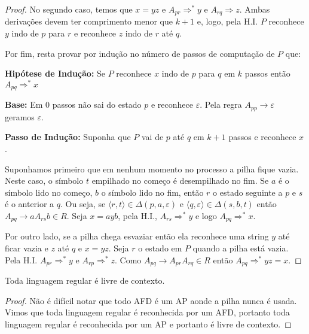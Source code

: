 \begin{proof}
No segundo caso, temos que $x = yz$ e $A_{pr} \Rightarrow^* y$ e $A_{rq} \Rightarrow z$.
Ambas derivações devem ter comprimento menor que $k + 1$ e, logo, pela H.I. $P$ reconhece $y$ indo de $p$ para $r$ e reconhece $z$ indo de $r$ até $q$.

Por fim, resta provar por indução no número de passos de computação de $P$ que:

{\bf Hipótese de Indução:} Se $P$ reconhece $x$ indo de $p$ para $q$ em $k$ passos então $A_{pq} \Rightarrow^* x$

{\bf Base:} Em $0$ passos não sai do estado $p$ e reconhece $\varepsilon$.
Pela regra $A_{pp} \to \varepsilon$ geramos $\varepsilon$.

{\bf Passo de Indução:} Suponha que $P$ vai de $p$ até $q$ em $k+1$ passos e reconhece $x$.

Suponhamos primeiro que em nenhum momento no processo a pilha fique vazia.
Neste caso, o símbolo $t$ empilhado no começo é desempilhado no fim.
Se $a$ é o símbolo lido no começo, $b$ o símbolo lido no fim, então $r$ o estado seguinte a $p$ e $s$ é o anterior a $q$.
Ou seja, se $\langle r,t \rangle \in \Delta(p, a, \varepsilon)$ e $\langle q, \varepsilon \rangle \in \Delta(s, b, t)$ então $A_{pq} \to a A_{rs} b \in R$.
Seja $x = ayb$, pela H.I., $A_{rs} \Rightarrow^* y$ e logo $A_{pq} \Rightarrow^* x$.

Por outro lado, se a pilha chega esvaziar então ela reconhece uma string $y$ até ficar vazia e $z$ até $q$ e $x = yz$.
Seja $r$ o estado em $P$ quando a pilha está vazia.
Pela H.I. $A_{pr} \Rightarrow^* y$ e $A_{rp} \Rightarrow^* z$.
Como $A_{pq} \to A_{pr} A_{rq} \in R$ então $A_{pq} \Rightarrow^* yz = x$.
\end{proof}


\begin{corollary}
  Toda linguagem regular é livre de contexto.
\end{corollary}
\begin{proof}
  Não é difícil notar que todo AFD é um AP aonde a pilha nunca é usada.
  Vimos que toda linguagem regular é reconhecida por um AFD, portanto toda linguagem regular é reconhecida por um AP e portanto é livre de contexto.
\end{proof}

